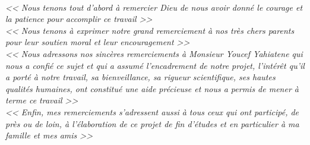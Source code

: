 \documentclass[12pt]{report}
\begin{document}
\begin{center}
\end{center}


\newpage

\vspace*{0.5in}

\thispagestyle{empty}

\begin{center}
    \textit{\fontsize{34}{46}{\bfseries{\color{Blue}{Remerciement}}}}
    \vspace{0.7in}
    \textit{
    \\\Large{<< Nous tenons tout d’abord à remercier Dieu de nous avoir donné le courage et la patience pour accomplir ce travail >>}
    \vspace{0.4in}
    \\\Large{<< Nous tenons à exprimer notre grand remerciement à nos très chers parents pour leur soutien moral et leur encouragement >>}
    \vspace{0.4in}
    \\\Large{<< Nous adressons nos sincères remerciements à Monsieur Youcef Yahiatene qui nous a confié ce sujet et qui a assumé l’encadrement de notre projet, l’intérêt qu’il a porté à notre travail, sa bienveillance, sa rigueur scientifique, ses hautes qualités humaines, ont constitué une aide précieuse et nous a permis de mener à terme ce travail >>}
    \vspace{0.4in}
    \\\Large{<< Enfin, mes remerciements s’adressent aussi à tous ceux qui ont participé, de près ou de loin, à l’élaboration de ce projet de fin d’études et en particulier à ma famille et mes amis >>}
    \\}
\end{center}

\newpage

\vspace*{0.2in}

\thispagestyle{empty}
\end{document}
